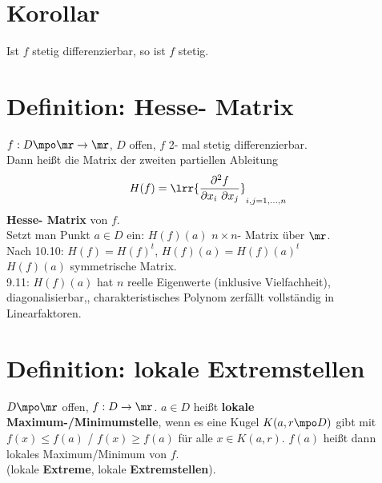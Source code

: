 \section{Korollar}
	Ist $f$ stetig differenzierbar, so ist $f$ stetig.

\section{Definition: Hesse- Matrix}
	$ f: D\mpo\mr\rightarrow\mr $, $ D $ offen, $ f $ 2- mal stetig differenzierbar.\\
	Dann heißt die Matrix der zweiten partiellen Ableitung
	\[ H(f)=\lrr{\dfrac{\partial^2 f}{\partial x_i\ \partial x_j}}_{i,j=1,...,n} \]
	\textbf{Hesse- Matrix} von $ f $.\\
	Setzt man Punkt $ a\in D $ ein: $ H(f)(a) $ $ n\times n $- Matrix über $ \mr $.\\
	Nach 10.10: $ H(f)=H(f)^t $, $ H(f)(a)=H(f)(a)^t $\\
	$ H(f)(a) $ symmetrische Matrix.\\
	9.11: $ H(f)(a) $ hat $ n $ reelle Eigenwerte (inklusive Vielfachheit), diagonalisierbar,, charakteristisches Polynom zerfällt vollständig in Linearfaktoren.
	
\section{Definition: lokale Extremstellen}
	$ D\mpo\mr $ offen, $ f:D\rightarrow\mr $. $ a\in D $ heißt \textbf{lokale Maximum-/Minimumstelle}, wenn es eine Kugel $ K(a,r\mpo D) $ gibt mit $ f(x)\leq f(a) $ / $ f(x)\geq f(a) $ für alle $ x\in K(a,r) $. $ f(a) $ heißt dann lokales Maximum/Minimum von $ f $.\\
	(lokale \textbf{Extreme}, lokale \textbf{Extremstellen}).
	

